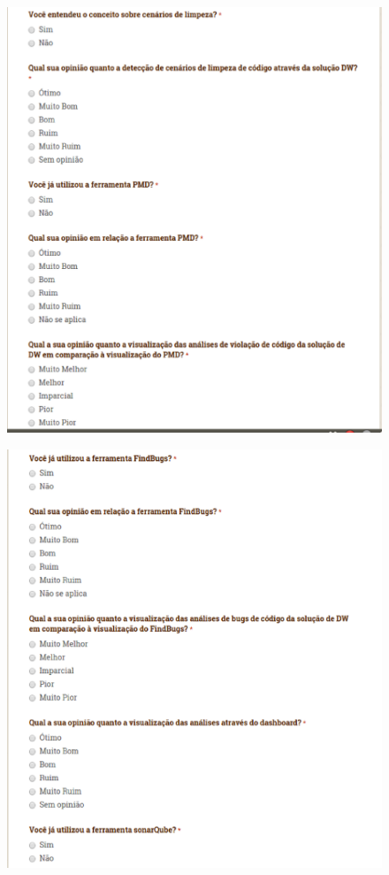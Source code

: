\begin{apendicesenv}
\begin{figure}[h!]
\centering
\includegraphics[keepaspectratio=false,scale=0.60]{figuras/figuras_nilton/questionario2.eps}
\label{questionario2}
\end{figure}

\begin{figure}[h!]
\centering
\includegraphics[keepaspectratio=false,scale=0.60]{figuras/figuras_nilton/questionario3.eps}
\label{questionario3}
\end{figure}



\end{apendicesenv}
